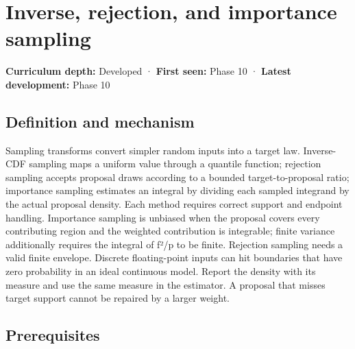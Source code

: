 \hypertarget{appendix-8d863ed954d0}{}\label{referencestart:appendix-8d863ed954d0}
\section{Inverse, rejection, and importance sampling}\label{appendix-8d863ed954d0-inverse-rejection-and-importance-sampling}

\hypertarget{appendix-8d863ed954d0-inverse-rejection-and-importance-sampling}{}

\textbf{Curriculum depth:} Developed · \textbf{First seen:} Phase 10 · \textbf{Latest development:} Phase 10

\begin{allmightroledefinition}

\subsection{Definition and mechanism}\label{appendix-8d863ed954d0-definition-and-mechanism}

\hypertarget{appendix-8d863ed954d0-definition-and-mechanism}{}

Sampling transforms convert simpler random inputs into a target law. Inverse-CDF sampling maps a uniform value through a quantile function; rejection sampling accepts proposal draws according to a bounded target-to-proposal ratio; importance sampling estimates an integral by dividing each sampled integrand by the actual proposal density. Each method requires correct support and endpoint handling. Importance sampling is unbiased when the proposal covers every contributing region and the weighted contribution is integrable; finite variance additionally requires the integral of f²/p to be finite. Rejection sampling needs a valid finite envelope. Discrete floating-point inputs can hit boundaries that have zero probability in an ideal continuous model. Report the density with its measure and use the same measure in the estimator. A proposal that misses target support cannot be repaired by a larger weight.

\end{allmightroledefinition}

\subsection{Prerequisites}\label{appendix-8d863ed954d0-prerequisites}

\hypertarget{appendix-8d863ed954d0-prerequisites}{}

